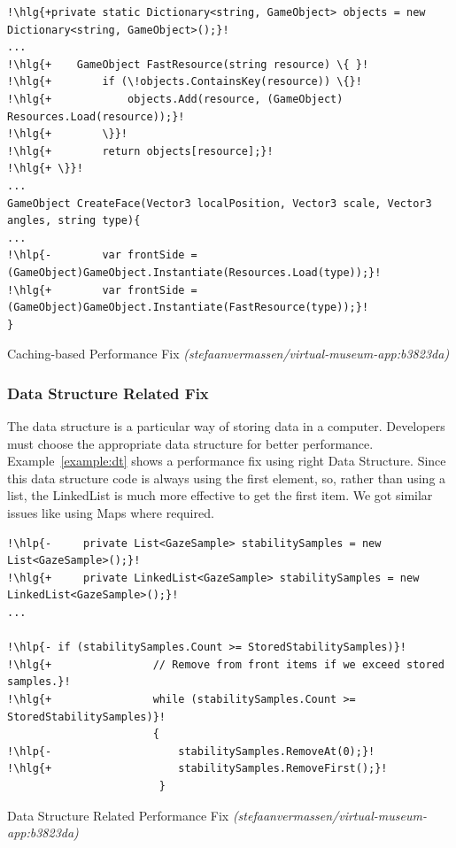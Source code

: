 \begin{example}
\begin{lstlisting}[escapechar=!]
!\hlg{+private static Dictionary<string, GameObject> objects = new Dictionary<string, GameObject>();}!
...
!\hlg{+    GameObject FastResource(string resource) \{ }!
!\hlg{+        if (\!objects.ContainsKey(resource)) \{}!
!\hlg{+            objects.Add(resource, (GameObject) Resources.Load(resource));}!
!\hlg{+        \}}!
!\hlg{+        return objects[resource];}!
!\hlg{+ \}}!
...
GameObject CreateFace(Vector3 localPosition, Vector3 scale, Vector3 angles, string type){
...
!\hlp{-        var frontSide = (GameObject)GameObject.Instantiate(Resources.Load(type));}!
!\hlg{+        var frontSide = (GameObject)GameObject.Instantiate(FastResource(type));}!
}
\end{lstlisting}
  \caption{Caching-based Performance Fix
  	\scriptsize{\textit{(stefaanvermassen/virtual-museum-app:b3823da)}}}
  \label{example:caching}  
\end{example}


\subsubsection{Data Structure Related Fix}
The data structure is a particular way of storing data in a computer. Developers must choose the appropriate data structure for better performance. Example~\ref{example:dt} shows a performance fix using right Data Structure. Since this data structure code is always using the first element, so, rather than using a list, the LinkedList is much more effective to get the first item. We got similar issues like using Maps where required.


\begin{example}
\begin{lstlisting}[escapechar=!]
!\hlp{-     private List<GazeSample> stabilitySamples = new List<GazeSample>();}!
!\hlg{+     private LinkedList<GazeSample> stabilitySamples = new LinkedList<GazeSample>();}!
...

!\hlp{- if (stabilitySamples.Count >= StoredStabilitySamples)}!
!\hlg{+                // Remove from front items if we exceed stored samples.}!
!\hlg{+                while (stabilitySamples.Count >= StoredStabilitySamples)}!
					   {
!\hlp{-                    stabilitySamples.RemoveAt(0);}!
!\hlg{+                    stabilitySamples.RemoveFirst();}!
          				}
\end{lstlisting}
  \caption{Data Structure Related Performance Fix
  	\scriptsize{\textit{(stefaanvermassen/virtual-museum-app:b3823da)}}}
  \label{example:dt}  
\end{example}


